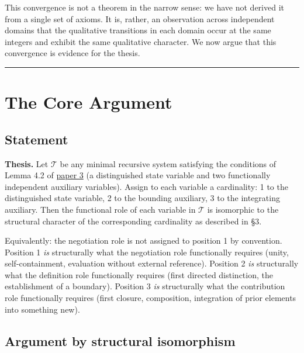\documentclass[12pt]{article}
\begin{document}
This convergence is not a theorem in the narrow sense: we have not
derived it from a single set of axioms. It is, rather, an observation
across independent domains that the qualitative transitions in each
domain occur at the same integers and exhibit the same qualitative
character. We now argue that this convergence is evidence for the
thesis.

\begin{center}\rule{0.5\linewidth}{0.5pt}\end{center}

\section{The Core Argument}\label{the-core-argument}

\subsection{Statement}\label{statement}

\textbf{Thesis.} Let \(\mathcal{T}\) be any minimal recursive system
satisfying the conditions of Lemma 4.2 of
\href{https://github.com/baardev/truevalue/blob/main/docnav/Research/papers/3_minimal-recursive-triadic-framework/3_minimal-recursive-triadic-framework.pdf}{paper
3} (a distinguished state variable and two functionally independent
auxiliary variables). Assign to each variable a cardinality: 1 to the
distinguished state variable, 2 to the bounding auxiliary, 3 to the
integrating auxiliary. Then the functional role of each variable in
\(\mathcal{T}\) is isomorphic to the structural character of the
corresponding cardinality as described in §3.

Equivalently: the negotiation role is not assigned to position 1 by
convention. Position 1 \emph{is} structurally what the negotiation role
functionally requires (unity, self-containment, evaluation without
external reference). Position 2 \emph{is} structurally what the
definition role functionally requires (first directed distinction, the
establishment of a boundary). Position 3 \emph{is} structurally what the
contribution role functionally requires (first closure, composition,
integration of prior elements into something new).

\subsection{Argument by structural isomorphism}\label{argument-by-structural-isomorphism}
\end{document}
